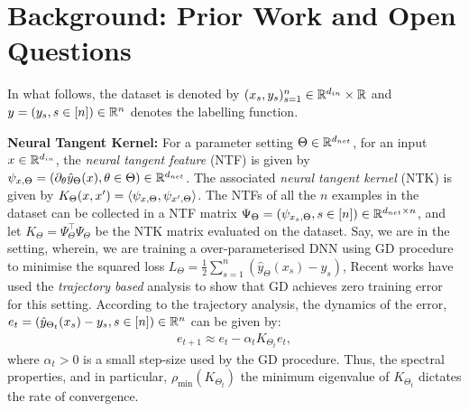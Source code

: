 \section{Background: Prior Work and Open Questions}
In what follows, the dataset is denoted by $(x_s,y_s)_{s=1}^n\in\mathbb{R}^{d_{in}}\times \mathbb{R}$ and $y=(y_s,s\in[n])\in\mathbb{R}^n$ denotes the labelling function.

\textbf{Neural Tangent Kernel:}
For a parameter setting $\Theta\in\mathbb{R}^{d_{net}}$, for an input $x\in \mathbb{R}^{d_{in}}$, the \emph{neural tangent feature} (NTF) is given by $\psi_{x,\Theta}=\left(\partial_{\theta}\hat{y}_{\Theta}(x),\theta\in\Theta\right)\in\mathbb{R}^{d_{net}}$. The associated \emph{neural tangent kernel} (NTK) is given by $K_{\Theta}(x,x')=\langle \psi_{x,\Theta},\psi_{x',\Theta}\rangle$. The NTFs of all the $n$ examples in the dataset can be collected in a NTF matrix $\Psi_{\Theta}=(\psi_{x_s,\Theta},s\in[n])\in\mathbb{R}^{d_{net}\times n}$, and let $K_{\Theta}=\Psi^\top_{\Theta}\Psi_{\Theta}$ be the NTK matrix evaluated on the dataset. Say, we are in the setting, wherein, we are training a over-parameterised DNN using GD procedure to minimise the squared loss $L_{\Theta}=\frac{1}{2}\sum_{s=1}^n \left(\hat{y}_{\Theta}(x_s)-y_s\right)$, Recent works have used the \emph{trajectory based} analysis to show that GD achieves zero training error for this setting. According to the trajectory analysis, the dynamics of the error, $e_t=(\hat{y}_{\Theta_t}(x_s)-y_s,s\in[n])\in\mathbb{R}^n$ can be given by:
\begin{align}
e_{t+1}\approx e_t-\alpha_t K_{\Theta_t} e_t,
\end{align}
where $\alpha_t>0$ is a small step-size used by the GD procedure. Thus, the spectral properties, and in particular, $\rho_{\min}(K_{\Theta_t})$ the minimum eigenvalue of $K_{\Theta_t}$ dictates the rate of convergence.

